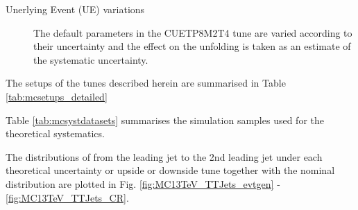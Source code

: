 \begin{description}
\begin{description}
  \item[Unerlying Event (UE) variations] The default parameters in the CUETP8M2T4 tune are varied according to their uncertainty and the effect on the unfolding is taken as an estimate of the systematic uncertainty.
  \end{description}
  The setups of the \PYTHIA tunes described herein are summarised in Table \ref{tab:mcsetups_detailed}
\end{description}

Table \ref{tab:mcsystdatasets} summarises the simulation samples used for the theoretical systematics.

The distributions of \pullangle from the leading jet \leadingjet to the 2nd leading jet \scndleadingjet under each theoretical uncertainty or upside or downside \PYTHIA tune together with the nominal distribution are plotted in Fig. \ref{fig:MC13TeV_TTJets_evtgen} - \ref{fig:MC13TeV_TTJets_CR}.



